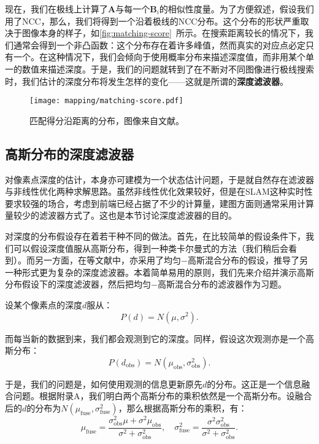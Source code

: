 现在，我们在极线上计算了$\bm{A}$与每一个$\bm{B}_i$的相似性度量。为了方便叙述，假设我们用了NCC，那么，我们将得到一个沿着极线的NCC分布。这个分布的形状严重取决于图像本身的样子，如\autoref{fig:matching-score}~所示。在搜索距离较长的情况下，我们通常会得到一个非凸函数：这个分布存在着许多峰值，然而真实的对应点必定只有一个。在这种情况下，我们会倾向于使用概率分布来描述深度值，而非用某个单一的数值来描述深度。于是，我们的问题就转到了在不断对不同图像进行极线搜索时，我们估计的深度分布将发生怎样的变化——这就是所谓的\textbf{深度滤波器}。

\begin{figure}[!htp]
	\centering
	\texttt{[image: mapping/matching-score.pdf]}
	\caption{匹配得分沿距离的分布，图像来自文献\cite{Vogiatzis2011}。}
	\label{fig:matching-score}
\end{figure}

\subsection{高斯分布的深度滤波器}
对像素点深度的估计，本身亦可建模为一个状态估计问题，于是就自然存在滤波器与非线性优化两种求解思路。虽然非线性优化效果较好，但是在SLAM这种实时性要求较强的场合，考虑到前端已经占据了不少的计算量，建图方面则通常采用计算量较少的滤波器方式了。这也是本节讨论深度滤波器的目的。

对深度的分布假设存在着若干种不同的做法。首先，在比较简单的假设条件下，我们可以假设深度值服从高斯分布，得到一种类卡尔曼式的方法（我们稍后会看到）。而另一方面，在\cite{Vogiatzis2011, Forster2014}等文献中，亦采用了均匀−高斯混合分布的假设，推导了另一种形式更为复杂的深度滤波器。本着简单易用的原则，我们先来介绍并演示高斯分布假设下的深度滤波器，然后把均匀−高斯混合分布的滤波器作为习题。

设某个像素点的深度$d$服从：
\begin{equation}
P(d) = N(\mu, \sigma^2).
\end{equation}

而每当新的数据到来，我们都会观测到它的深度。同样，假设这次观测亦是一个高斯分布：
\begin{equation}
P(d_{\mathrm{obs}}) = N(\mu_{\mathrm{obs}}, \sigma_{\mathrm{obs}}^2 ).
\end{equation}

于是，我们的问题是，如何使用观测的信息更新原先$d$的分布。这正是一个信息融合问题。根据附录A，我们明白两个高斯分布的乘积依然是一个高斯分布。设融合后的$d$的分布为$N(\mu_{\mathrm{fuse}}, \sigma_{\mathrm{fuse}}^2)$，那么根据高斯分布的乘积，有：
\begin{equation}
{\mu _{\mathrm{fuse}}} = \frac{{\sigma _{\mathrm{obs}}^2\mu  + {\sigma ^2}{\mu _{\mathrm{obs}}}}}{{{\sigma ^2} + \sigma _{\mathrm{obs}}^2}},\quad \sigma _{\mathrm{fuse}}^2 = \frac{{{\sigma ^2}\sigma _{\mathrm{obs}}^2}}{{{\sigma ^2} + \sigma _{\mathrm{obs}}^2}}.
\end{equation}

